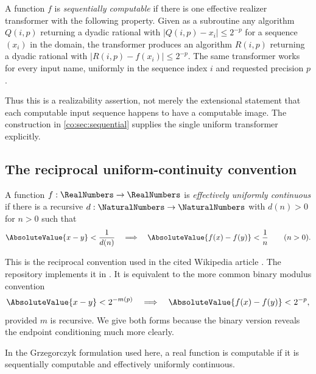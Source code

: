 \begin{definition}\label{co:def:sequential}
A function $f$ is \emph{sequentially computable} if there is one effective
realizer transformer with the following property.  Given as a subroutine any
algorithm $Q(i,p)$ returning a dyadic rational with
$|Q(i,p)-x_i|\le2^{-p}$ for a sequence $(x_i)$ in the domain, the transformer
produces an algorithm $R(i,p)$ returning a dyadic rational with
$|R(i,p)-f(x_i)|\le2^{-p}$.  The same transformer works for every input name,
uniformly in the sequence index $i$ and requested precision $p$.
\end{definition}

Thus this is a realizability assertion, not merely the extensional statement
that each computable input sequence happens to have a computable image.  The
construction in \cref{co:sec:sequential} supplies the single uniform
transformer explicitly.

\subsection{The reciprocal uniform-continuity convention}

\begin{definition}\label{co:def:euc}
A function $f:\RealNumbers\to\RealNumbers$ is \emph{effectively uniformly continuous} if there
is a recursive $d:\NaturalNumbers\to\NaturalNumbers$ with $d(n)>0$ for $n>0$ such that
\begin{equation}\label{co:eq:euc-def}
 \AbsoluteValue{x-y}<\frac1{d(n)}
 \quad\Longrightarrow\quad
 \AbsoluteValue{f(x)-f(y)}<\frac1n
 \qquad(n>0).
\end{equation}
\end{definition}

This is the reciprocal convention used in the cited Wikipedia article
\cite{co:WikipediaCRF}.  The repository implements it in
.  It is equivalent to the more common binary
modulus convention
\begin{equation}\label{co:eq:binary-modulus-convention}
 \AbsoluteValue{x-y}<2^{-m(p)}
 \quad\Longrightarrow\quad
 \AbsoluteValue{f(x)-f(y)}<2^{-p},
\end{equation}
provided $m$ is recursive.  We give both forms because the binary version
reveals the endpoint conditioning much more clearly.

\begin{definition}\label{co:def:computable-function}
In the Grzegorczyk formulation used here, a real function is computable if it
is sequentially computable and effectively uniformly continuous.
\end{definition}

